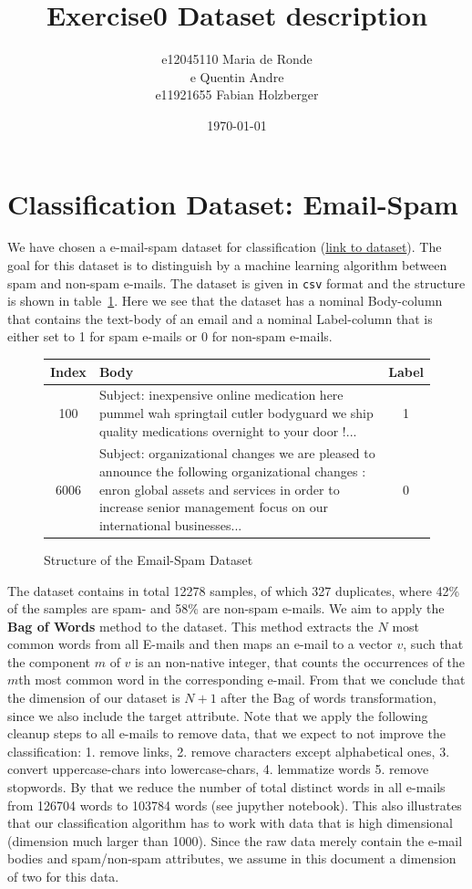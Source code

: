 \documentclass[11pt]{article}
\title{Exercise0 Dataset description}
\author{e12045110 Maria de Ronde \\ e Quentin Andre  \\ e11921655 Fabian Holzberger }
\date{\today}
\begin{document}
\graphicspath{{./figures/}}
\maketitle

\newpage
%
\section{Classification Dataset: Email-Spam}
We have chosen a e-mail-spam dataset for classification (\href{https://www.kaggle.com/nitishabharathi/email-spam-dataset?select=enronSpamSubset.csv}{link to dataset}). The goal for this dataset is to distinguish by a machine learning algorithm between spam and non-spam e-mails. The dataset is given in \texttt{csv} format and the structure is shown in table~\ref{tab::0}. Here we see that the dataset has a nominal Body-column that contains the text-body of an email and a nominal Label-column that is either set to 1 for spam e-mails or 0 for non-spam e-mails.
%
\begin{figure}[h]
  \begin{tabular}{ | c | p{13cm} | c |}
    \hline
    Index & Body & Label \\
    \hline
    100 & 
    Subject: inexpensive online medication here
 pummel wah springtail cutler bodyguard
 we ship quality medications overnight to your door !...
    & 1 \\ \hline
    6006
    &
    Subject: organizational changes
 we are pleased to announce the following organizational changes :
 enron global assets and services
 in order to increase senior management focus on our international businesses... 
    & 0 \\
    \hline
    \end{tabular}
    \caption{Structure of the Email-Spam Dataset}
    \label{tab::0}
  \end{figure}
%
The dataset contains in total 12278 samples, of which 327 duplicates, where 42\% of the samples are spam- and 58\% are non-spam e-mails. %
We aim to apply the \textbf{Bag of Words} method to the dataset. This method extracts the $N$ most common words from all E-mails and then maps an e-mail to a vector $v$, such that the component $m$ of $v$ is an non-native integer, that counts the occurrences of the $m$th most common word in the corresponding e-mail. From that we conclude that the dimension of our dataset is $N+1$ after the Bag of words transformation, since we also include the target attribute. Note that we apply the following cleanup steps to all e-mails to remove data, that we expect to not improve the classification: 1. remove links, 2. remove characters except alphabetical ones, 3. convert uppercase-chars into lowercase-chars, 4. lemmatize words 5. remove stopwords. By that we reduce the number of total distinct words in all e-mails from 126704 words to 103784 words (see jupyther notebook). This also illustrates that our classification algorithm has to work with data that is high dimensional (dimension much larger than 1000). Since the raw data merely contain the e-mail bodies and spam/non-spam attributes, we assume in this document a dimension of two for this data.         
\end{document}
